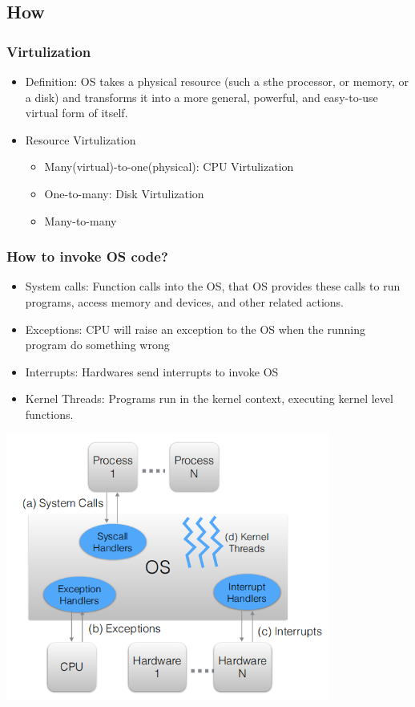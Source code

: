 \documentclass[12pt]{article}
\begin{document}
\subsection{How}
\subsubsection{Virtulization}
\begin{itemize}
    \item Definition: OS takes a physical resource (such a sthe processor, or memory, or a disk) and transforms it into a more general, powerful, and easy-to-use virtual form of itself.
    \item Resource Virtulization \begin{itemize}
        \item Many(virtual)-to-one(physical): CPU Virtulization
        \item One-to-many: Disk Virtulization
        \item Many-to-many
    \end{itemize}
\end{itemize}
\subsubsection{How to invoke OS code?}
\begin{itemize}
    \item System calls: Function calls into the OS, that OS provides these calls to run programs, access memory and devices, and other related actions.
    \item Exceptions: CPU will raise an exception to the OS when the running program do something wrong
    \item Interrupts: Hardwares send interrupts to invoke OS
    \item Kernel Threads: Programs run in the kernel context, executing kernel level functions.
\end{itemize}
\includegraphics[width=0.8\textwidth]{FourWaysToInvokeOS.png}
\end{document}
